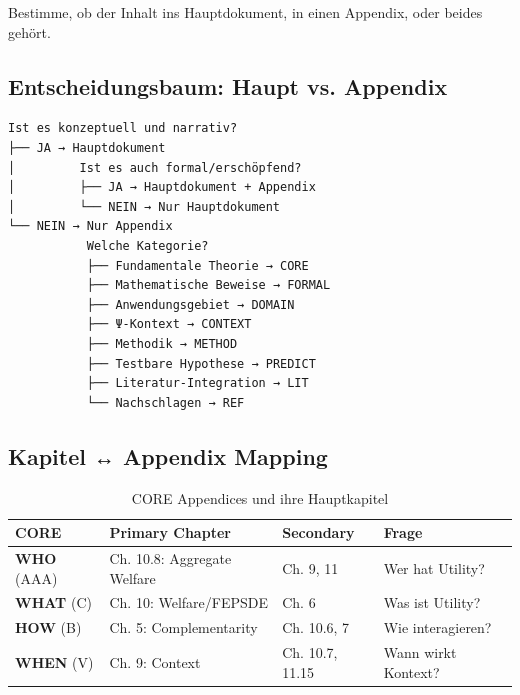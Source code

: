 \documentclass[12pt,a4paper]{article}
\begin{document}
\begin{tcolorbox}[colback=gray!5!white, colframe=gray!75!black,
    title=\textbf{Schritt 3: Hauptdokument oder Appendix?}]

Bestimme, ob der Inhalt ins Hauptdokument, in einen Appendix, oder beides gehört.

\end{tcolorbox}

\subsection{Entscheidungsbaum: Haupt vs. Appendix}

\begin{verbatim}
Ist es konzeptuell und narrativ?
├── JA → Hauptdokument
│         Ist es auch formal/erschöpfend?
│         ├── JA → Hauptdokument + Appendix
│         └── NEIN → Nur Hauptdokument
└── NEIN → Nur Appendix
           Welche Kategorie?
           ├── Fundamentale Theorie → CORE
           ├── Mathematische Beweise → FORMAL
           ├── Anwendungsgebiet → DOMAIN
           ├── Ψ-Kontext → CONTEXT
           ├── Methodik → METHOD
           ├── Testbare Hypothese → PREDICT
           ├── Literatur-Integration → LIT
           └── Nachschlagen → REF
\end{verbatim}

\subsection{Kapitel ↔ Appendix Mapping}

\begin{table}[htbp]
\centering
\caption{CORE Appendices und ihre Hauptkapitel}
\renewcommand{\arraystretch}{1.3}
\begin{tabular}{@{}llll@{}}
\toprule
\textbf{CORE} & \textbf{Primary Chapter} & \textbf{Secondary} & \textbf{Frage} \\
\midrule
\textbf{WHO} (AAA) & Ch. 10.8: Aggregate Welfare & Ch. 9, 11 & Wer hat Utility? \\
\textbf{WHAT} (C) & Ch. 10: Welfare/FEPSDE & Ch. 6 & Was ist Utility? \\
\textbf{HOW} (B) & Ch. 5: Complementarity & Ch. 10.6, 7 & Wie interagieren? \\
\textbf{WHEN} (V) & Ch. 9: Context & Ch. 10.7, 11.15 & Wann wirkt Kontext? \\
\bottomrule
\end{tabular}
\end{table}
\end{document}
